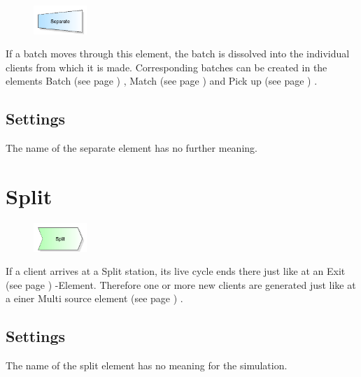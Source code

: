 \begin{figure}
\vspace{-22pt}
\includegraphics[width=2cm]{imageModelElementSeparate.png}
\vspace{-22pt}
\end{figure}

If a batch moves through this element, the batch is dissolved into the individual clients from which it is made.
Corresponding batches can be created in the elements Batch (see page \pageref{ref:ModelElementBatch}) ,
Match (see page \pageref{ref:ModelElementMatch}) and Pick up (see page \pageref{ref:ModelElementPickUp}) .

\subsection*{Settings}

The name of the separate element has no further meaning.


\section{Split}
\label{ref:ModelElementSplit}

\begin{figure}
\vspace{-22pt}
\includegraphics[width=2cm]{imageModelElementSplit.png}
\vspace{-22pt}
\end{figure}

If a client arrives at a Split station, its live cycle ends there just like
at an  Exit (see page \pageref{ref:ModelElementDispose}) -Element.
Therefore one or more new clients are generated just like at a
einer Multi source element (see page \pageref{ref:ModelElementSourceMulti}) .

\subsection*{Settings}

The name of the split element has no meaning for the simulation.

